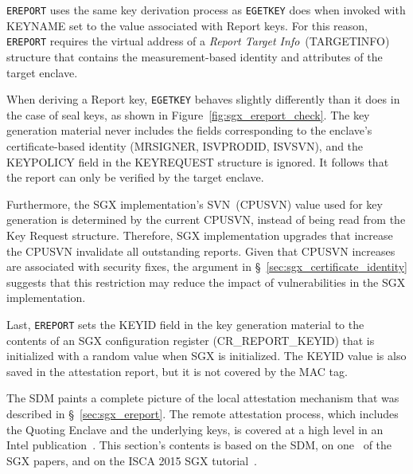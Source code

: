 \texttt{EREPORT} uses the same key derivation process as \texttt{EGETKEY}
does when invoked with KEYNAME set to the value associated with Report keys.
For this reason, \texttt{EREPORT} requires the virtual address of a
\textit{Report Target Info}~(TARGETINFO) structure that contains the
measurement-based identity and attributes of the target enclave.


When deriving a Report key, \texttt{EGETKEY} behaves slightly differently than
it does in the case of seal keys, as shown in
Figure~\ref{fig:sgx_ereport_check}. The key generation material never includes
the fields corresponding to the enclave's certificate-based identity (MRSIGNER,
ISVPRODID, ISVSVN), and the KEYPOLICY field in the KEYREQUEST structure is
ignored. It follows that the report can only be verified by the target enclave.

Furthermore, the SGX implementation's SVN~(CPUSVN) value used for key generation
is determined by the current CPUSVN, instead of being read from the Key Request
structure. Therefore, SGX implementation upgrades that increase the CPUSVN
invalidate all outstanding reports. Given that CPUSVN increases are associated
with security fixes, the argument in \S~\ref{sec:sgx_certificate_identity}
suggests that this restriction may reduce the impact of vulnerabilities in the
SGX implementation.

Last, \texttt{EREPORT} sets the KEYID field in the key generation material to
the contents of an SGX configuration register (CR\_REPORT\_KEYID) that is
initialized with a random value when SGX is initialized. The KEYID value is
also saved in the attestation report, but it is not covered by the MAC tag.



\label{sec:sgx_quoting_enclave}

The SDM paints a complete picture of the local attestation mechanism that was
described in \S~\ref{sec:sgx_ereport}. The remote attestation process, which
includes the Quoting Enclave and the underlying keys, is covered at a high
level in an Intel publication~\cite{johnson2016sgxprovisioning}. This section's
contents is based on the SDM, on one~\cite{anati2013sgx} of the SGX papers, and
on the ISCA 2015 SGX tutorial~\cite{intel2015iscasgx}.

